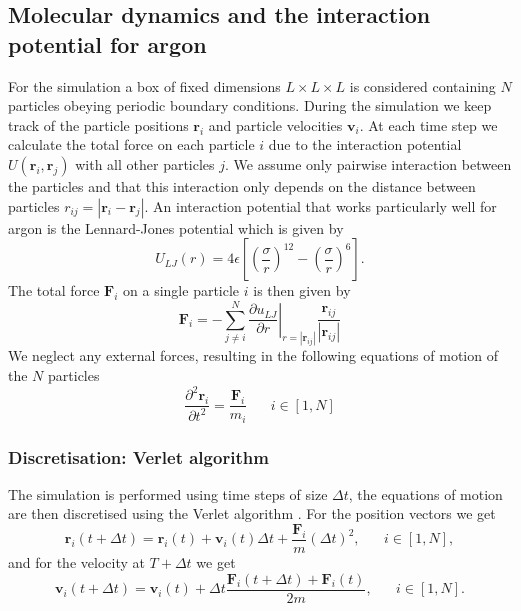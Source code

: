 \documentclass[twoside]{article}
\begin{document}
\subsection{Molecular dynamics and the interaction potential for argon}
For the simulation a box of fixed dimensions $L\times L\times L$ is considered containing $N$ particles obeying periodic boundary conditions. During the simulation we keep track of the particle positions $\mathbf{r}_i$ and particle velocities $\mathbf{v}_i$. At each time step we calculate the total force on each particle $i$ due to the interaction potential $U(\mathbf{r}_i,\mathbf{r}_j)$ with all other particles $j$.  
We assume only pairwise interaction between the particles and that this interaction only depends on the distance between particles $r_{ij} = | \mathbf{r}_i - \mathbf{r}_j |$. An interaction potential that works particularly well for argon is the Lennard-Jones potential which is given by
\begin{equation}\label{eq_lj}
U_{LJ}(r) = 4\epsilon \left[\left(\frac{\sigma}{r}\right)^{12} - \left(\frac{\sigma}{r}\right)^6  \right].
\end{equation}
The total force  $\mathbf{F}_i$  on a single particle $i$ is then given by 
\begin{equation}\label{eq_force_sum}
\mathbf{F}_i = -\sum_{j\not=i}^N \left.\frac{\partial u_{LJ}}{\partial r}\right|_{r= |\mathbf{r}_{ij}|}  \frac{\mathbf{r}_{ij}}{|\mathbf{r}_{ij}|}
\end{equation}
We neglect any external forces, resulting in the following equations of motion of the $N$ particles
\begin{equation}\label{eq_motion}
\frac{\partial ^2\mathbf{r}_i}{\partial t^2} = \frac{\mathbf{F}_i}{m_i} \hspace{20pt} i\in [1, N]
\end{equation}

\subsubsection*{Discretisation: Verlet algorithm}

The simulation is performed using time steps of size $\Delta t$, the equations of motion are then discretised using the Verlet algorithm \cite{ref_verlet}. For the position vectors we get
\begin{equation}\label{eq_verlet_pos}
\mathbf{r}_i(t+\Delta t) = \mathbf{r}_i(t) + \mathbf{v}_i(t)\Delta t + \frac{\mathbf{F}_i}{m}(\Delta t) ^2,  \hspace{20pt} i\in [1, N],
\end{equation}
and for the velocity at $T+\Delta t$ we get
\begin{equation}\label{eq_verlet_vel}
\mathbf{v}_i(t+\Delta t) = \mathbf{v}_i(t) + \Delta t \frac{\mathbf{F}_i(t + \Delta t) + \mathbf{F}_i(t)}{2m},  \hspace{20pt} i\in [1, N].
\end{equation}
\end{document}
